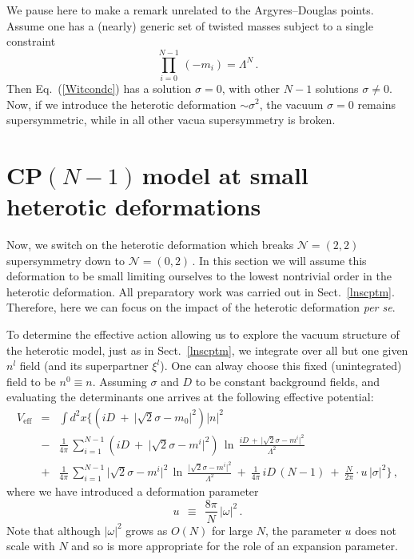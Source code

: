 \documentclass[epsfig,12pt]{article}
\def\beq{\begin{equation}}
\def\eeq{\end{equation}}
\def\beqn{\begin{eqnarray}}
\def\eeqn{\end{eqnarray}}
\newcommand{\ntt}{${\mathcal N}=(2,2)\,$}
\newcommand{\nzt}{${\mathcal N}=(0,2)\,$}
\newcommand{\cpn}{CP$(N-1)\,$}
\def\beqn{\begin{eqnarray}}
\def\eeqn{\end{eqnarray}}
\def\beq{\begin{equation}}
\def\eeq{\end{equation}}
\begin{document}
{We pause here to make a remark unrelated to the Argyres--Douglas points. Assume one has a (nearly) generic
set of twisted masses subject to a single constraint
\beq
\prod_{i=0}^{N-1}\,(-m_i)  = \Lambda^N\,.
\label{weass}
\eeq
Then Eq.~(\ref{Witcondc}) has a solution $\sigma =0$, with other $N-1$ solutions
$\sigma\neq 0$. Now, if we introduce the heterotic deformation $\sim \sigma^2$,
the vacuum $\sigma =0$ remains supersymmetric, while in all other vacua supersymmetry
is broken.

\section{\cpn model at small heterotic  deformations}
\label{hecpnsm}
\setcounter{equation}{0}

Now, we switch on the heterotic deformation which breaks \ntt\, supersymmetry down to \nzt\!.
In this section we will assume this deformation to be small limiting ourselves to the lowest
nontrivial order in the heterotic deformation. All preparatory work was carried out in Sect.~\ref{lnscptm}.
Therefore, here we can focus on the impact of the heterotic deformation {\em per se}.

To determine the effective action allowing us to explore the vacuum structure of the
heterotic
model, just as in Sect.~\ref{lnscptm}, we integrate over all but one given $ n^l $ field (and its superpartner $ \xi^l $).
One can alway choose this fixed (unintegrated) field to be   $n^0\equiv n$.
Assuming $\sigma$ and $D$ to be constant background fields,
and  evaluating the determinants
one arrives at the following effective potential:
\beqn
	V_\text{eff} & =& \int d^2x 
		\biggl\{  \left( iD ~+~ \bigl|\sqrt{2}\sigma -  m_0 \bigr|^2 \right) |n|^2 
	\nonumber\\[4mm]
	&-& 
	\frac{1}{4\pi}\, \sum_{i=1}^{N-1} \left( iD ~+~ \bigl|\sqrt{2}\sigma -  m^i \bigr|^2 \right)\,
		\ln\, \frac{ iD \,+\, \bigl| \sqrt{2}\sigma - m^i \bigr|^2} {\Lambda^2}
\label{Veff}
\\[4mm]
	&+&
	\frac{1}{4\pi}\, \sum_{i=1}^{N-1} \bigl|\sqrt{2}\sigma - m^i \bigr|^2\,
			\ln\, \frac{ \bigl| \sqrt{2}\sigma - m^i \bigr|^2 } { \Lambda^2 }
	~+~
	\frac{1}{4\pi}\, iD\, (N-1) 
	~+~
	\frac{N}{2\pi} \cdot u\, \bigl|\sigma\bigr|^2 \biggr\} \,,
	\nonumber
\eeqn
where we have introduced a deformation parameter
 \beq
u ~~\equiv~~ \frac{8\pi}{N}\,|\omega|^2 \,.
\label{u}
\eeq	
Note that although $ |\omega|^2 $ grows as $ O(N) $ for large $N$, the parameter $u$ 
does not scale with $N$ and so is more appropriate for the r{o}le of an expansion parameter. 

}
\end{document}

